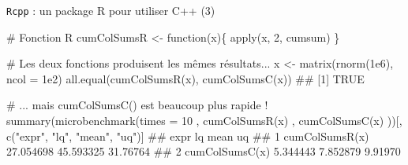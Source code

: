 \documentclass[12pt,ignorenonframetext,]{beamer}
\newenvironment{Shaded}{}{}
\newcommand{\KeywordTok}[1]{\textcolor[rgb]{0.00,0.00,1.00}{#1}}
\newcommand{\DataTypeTok}[1]{#1}
\newcommand{\DecValTok}[1]{#1}
\newcommand{\FloatTok}[1]{#1}
\newcommand{\StringTok}[1]{\textcolor[rgb]{0.00,0.50,0.50}{#1}}
\newcommand{\CommentTok}[1]{\textcolor[rgb]{0.00,0.50,0.00}{#1}}
\newcommand{\ControlFlowTok}[1]{\textcolor[rgb]{0.00,0.00,1.00}{#1}}
\newcommand{\NormalTok}[1]{#1}
\renewenvironment{Shaded}{\begin{snugshade}}{\end{snugshade}}
\begin{document}
\begin{frame}[fragile]{\texttt{Rcpp} : un package R pour utiliser C++
(3)}

\footnotesize

\begin{Shaded}
\begin{Highlighting}[]
\CommentTok{# Fonction R}
\NormalTok{cumColSumsR <-}\StringTok{ }\ControlFlowTok{function}\NormalTok{(x)\{}
  \KeywordTok{apply}\NormalTok{(x, }\DecValTok{2}\NormalTok{, cumsum)}
\NormalTok{\}}

\CommentTok{# Les deux fonctions produisent les mêmes résultats...}
\NormalTok{x <-}\StringTok{ }\KeywordTok{matrix}\NormalTok{(}\KeywordTok{rnorm}\NormalTok{(}\FloatTok{1e6}\NormalTok{), }\DataTypeTok{ncol =} \FloatTok{1e2}\NormalTok{)}
\KeywordTok{all.equal}\NormalTok{(}\KeywordTok{cumColSumsR}\NormalTok{(x), }\KeywordTok{cumColSumsC}\NormalTok{(x))}
\NormalTok{  ## [1] TRUE}

\CommentTok{# ... mais cumColSumsC() est beaucoup plus rapide !}
\KeywordTok{summary}\NormalTok{(}\KeywordTok{microbenchmark}\NormalTok{(}\DataTypeTok{times =} \DecValTok{10}
\NormalTok{  , }\KeywordTok{cumColSumsR}\NormalTok{(x)}
\NormalTok{  , }\KeywordTok{cumColSumsC}\NormalTok{(x)}
\NormalTok{))[, }\KeywordTok{c}\NormalTok{(}\StringTok{"expr"}\NormalTok{, }\StringTok{"lq"}\NormalTok{, }\StringTok{"mean"}\NormalTok{, }\StringTok{"uq"}\NormalTok{)]}
\NormalTok{  ##             expr        lq      mean       uq}
\NormalTok{  ## 1 cumColSumsR(x) 27.054698 45.593325 31.76764}
\NormalTok{  ## 2 cumColSumsC(x)  5.344443  7.852879  9.91970}
\end{Highlighting}
\end{Shaded}

\end{frame}
\end{document}
